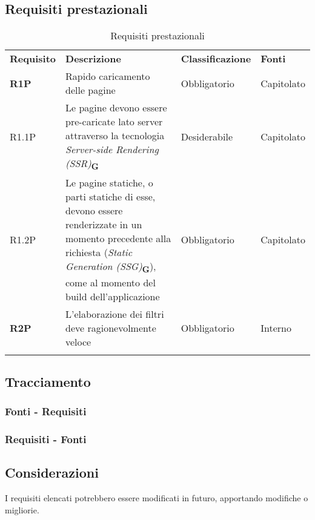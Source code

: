 \subsection{Requisiti prestazionali}
\begin{center}
    \centering
    \renewcommand{\arraystretch}{1.8}
    \label{tab:RequisitiPrestazionali}
    \begin{longtable}[!h]{p{50px} p{200px} p{100px} p{50px}}
        \rowcolor{logo!70} \textbf{Requisito} & \textbf{Descrizione}                                                                                                                                                                                                       & \textbf{Classificazione} & \textbf{Fonti} \\
        \textbf{R1P}                          & Rapido caricamento delle pagine                                                                                                                                                                                            & Obbligatorio             & Capitolato     \\
        R1.1P                                 & Le pagine devono essere pre-caricate lato server attraverso la tecnologia \textit{Server-side Rendering (SSR)}\textsubscript{\textbf{G}}                                                                                   & Desiderabile             & Capitolato     \\
        R1.2P                                 & Le pagine statiche, o parti statiche di esse, devono essere renderizzate in un momento precedente alla richiesta (\textit{Static Generation (SSG)}\textsubscript{\textbf{G}}), come al momento del build dell'applicazione & Obbligatorio             & Capitolato     \\
        \textbf{R2P}                          & L'elaborazione dei filtri deve ragionevolmente veloce                                                                                                                                                                      & Obbligatorio             & Interno        \\
        \rowcolor{white}\caption{Requisiti prestazionali}
    \end{longtable}
\end{center}

\newpage
\subsection{Tracciamento}
\subsubsection{Fonti - Requisiti}


\newpage
\subsubsection{Requisiti - Fonti}


\subsection{Considerazioni}
I requisiti elencati potrebbero essere modificati in futuro, apportando modifiche o migliorie.